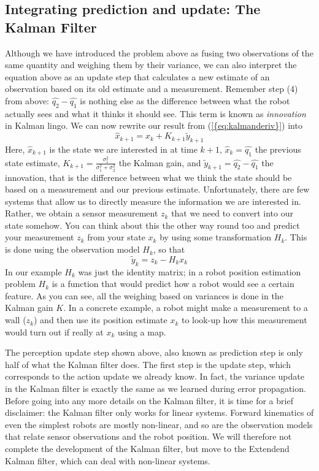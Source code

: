 \subsection{Integrating prediction and update: The Kalman Filter}
Although we have introduced the problem above as fusing two observations of the same quantity and weighing them by their variance, we can also interpret the equation above as an update step that calculates a new estimate of an observation based on its old estimate and a measurement. Remember step (4) from above: $ \hat{q_2}-\hat{q_1}$ is nothing else as the difference between what the robot actually sees and what it thinks it should see. This term  is known as \emph{innovation} in Kalman lingo. We can now 
rewrite our result from (\ref{{eq:kalmanderiv}}) into
\begin{equation}
\hat{x}_{k+1}=\hat{x}_k+K_{k+1}\tilde{y}_{k+1}
\end{equation}
Here, $ \hat{x}_{k+1}$ is the state we are interested in at time $ k+1$, $\hat{x}_k=\hat{q_1}$ the previous state estimate, $ K_{k+1}=\frac{\sigma_1^2}{\sigma_1^2+\sigma_2^2}$ the Kalman gain, and $ \tilde{y}_{k+1}=\hat{q_2}-\hat{q_1}$  the innovation, that is the difference between what we think the state should be based on a measurement and our previous estimate. Unfortunately, there are few systems that allow us to directly measure the information we are interested in. Rather, we obtain a sensor measurement $z_k$ that we need to convert into our state somehow. You can think about this the other way round too and predict your measurement $z_k$ from your state $x_k$ by using some transformation $H_k$. This is done using the observation model $H_k$, so that
\begin{equation}
\tilde{y}_{k}=z_k-H_k x_k
\end{equation}
In our example $ H_k$ was just the identity matrix; in a robot position estimation problem $ H_k$ is a function that would predict how a robot would see a certain feature. As you can see, all the weighing based on variances is done in the Kalman gain $ K$. In a concrete example, a robot might make a measurement to a wall ($z_k$) and then use its position estimate $x_k$ to look-up how this measurement would turn out if really at $x_k$ using a map. 

The perception update step shown above, also known as prediction step is only half of what the Kalman filter does. The first step is the update step, which corresponds to the action update we already know. In fact, the variance update in the Kalman filter is exactly the same as we learned during error propagation. Before going into any more details on the Kalman filter, it is time for a brief disclaimer: the Kalman filter only works for linear systems. Forward kinematics of even the simplest robots are mostly non-linear, and so are the observation models that relate sensor observations and the robot position. We will therefore not complete the development of the Kalman filter, but move to the Extendend Kalman filter, which can deal with non-linear systems.


